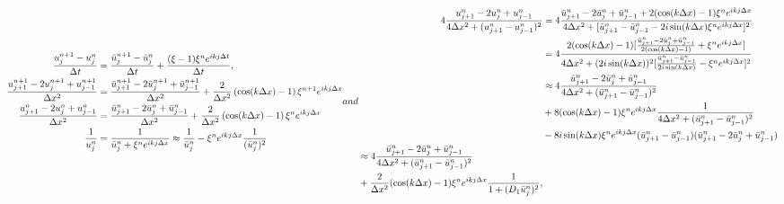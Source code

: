 \begin{subequations}
	\begin{align}
	\frac{u^{n+1}_j - u^n_j}{\Delta t} 
&= \frac{\bar u^{n+1}_j - \bar u^n_j}{\Delta t} 
+ \frac{(\xi - 1)\xi^n e^{ikj\Delta t}}{\Delta t}, 
\\
 \frac{u^{n+1}_{j+1} - 2u^{n+1}_j + u^{n+1}_{j-1}}{\Delta x^2}
&= \frac{\bar u^{n+1}_{j+1} - 2\bar u^{n+1}_j + \bar u^{n+1}_{j-1}}{\Delta x^2}
+ \frac{2}{\Delta x^2}\left(\cos(k\Delta x) - 1\right) \xi^{n+1} e^{ikj\Delta x}
\\
	\frac{u^n_{j+1} - 2u^n_j + u^n_{j-1}}{\Delta x^2}
&= \frac{\bar u^n_{j+1} - 2\bar u^n_j + \bar u^n_{j-1}}{\Delta x^2} 
+ \frac{2}{\Delta x^2}\left(\cos(k\Delta x)-1\right) \xi^n e^{ikj\Delta x}
\\
	\frac{1}{u^n_j} 
&= \frac{1}{\bar u^n_j + \xi^n e^{ikj\Delta x}} 
\approx \frac{1}{\bar u^n_j} - \xi^n e^{ikj\Delta x} \frac{1}{(\bar u^n_j)^2}
	\end{align}
and 
\begin{align}
4\frac{u^n_{j+1} - 2u^n_j + u^n_{j-1}}{4\Delta x^2 + (u^n_{j+1} - u^n_{j-1})^2} 
&= 4\frac{\bar u^n_{j+1} - 2\bar u^n_j + \bar u^n_{j-1} + 2(\cos(k\Delta x)-1)\xi^ne^{ikj\Delta x}}{4\Delta x^2 + [\bar u^n_{j+1} - \bar u^n_{j-1} - 2i\sin(k\Delta x)\xi^ne^{ikj\Delta x}]^2}
\notag
\\
&= 4\frac{2(\cos(k\Delta x)-1)[\frac{\bar u^n_{j+1} - 2\bar u^n_j + \bar u^n_{j-1}}{2(\cos(k\Delta x)-1)} + \xi^n e^{ikj\Delta x}]}{4\Delta x^2 + (2i\sin(k\Delta x))^2[\frac{\bar u^n_{j+1} - \bar u^n_{j-1}}{2i\sin(k\Delta x)} - \xi^n e^{ikj\Delta x}]^2}
\notag\\
&\approx 4\frac{\bar u^n_{j+1} - 2\bar u^n_{j} + \bar u^n_{j-1}}{4\Delta x^2 + (\bar u^n_{j+1} - \bar u^n_{j-1})^2}
\notag\\
&+ 8(\cos(k\Delta x)-1)\xi^ne^{ikj\Delta x}\frac{1}{4\Delta x^2 + (\bar u^n_{j+1} - \bar u^n_{j-1})^2}
\notag\\ 
&-8i\sin(k\Delta x)\xi^ne^{ikj\Delta x}(\bar u^n_{j+1} - \bar u^n_{j-1})(\bar u^n_{j+1} - 2\bar u^n_{j} + \bar u^n_{j-1}) 
\notag\\
\begin{split} 
&\approx 4\frac{\bar u^n_{j+1} - 2\bar u^n_{j} + \bar u^n_{j-1}}{4\Delta x^2 + (\bar u^n_{j+1} - \bar u^n_{j-1})^2}
\\
&+ \frac{2}{\Delta x^2}(\cos(k\Delta x)-1)\xi^ne^{ikj\Delta x} \frac{1}{1 + (
	D_1 \bar u^n_j
	)^2},
\end{split}
\end{align}
\label{ammc_von_neumann}
\end{subequations}
